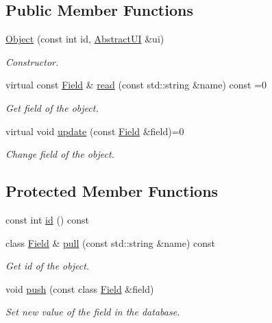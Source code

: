 \subsection*{Public Member Functions}
\begin{DoxyCompactItemize}
\item 
\hyperlink{classCore_1_1Object_ad6367757cadcf5d33d30db9210a545b3}{Object} (const int id, \hyperlink{classCore_1_1AbstractUI}{AbstractUI} \&ui)
\begin{DoxyCompactList}\small\item\em Constructor. \item\end{DoxyCompactList}\item 
virtual const \hyperlink{classCore_1_1Field}{Field} \& \hyperlink{classCore_1_1Object_a90137d9981bd680bd395460e643c6560}{read} (const std::string \&name) const =0
\begin{DoxyCompactList}\small\item\em Get field of the object. \item\end{DoxyCompactList}\item 
virtual void \hyperlink{classCore_1_1Object_a53328d659235e29f418ff4890cc3bdb3}{update} (const \hyperlink{classCore_1_1Field}{Field} \&field)=0
\begin{DoxyCompactList}\small\item\em Change field of the object. \item\end{DoxyCompactList}\end{DoxyCompactItemize}
\subsection*{Protected Member Functions}
\begin{DoxyCompactItemize}
\item 
const int \hyperlink{classCore_1_1Object_a0d6969d36a81dbfa8d832f43eebea9f7}{id} () const 
\item 
class \hyperlink{classCore_1_1Field}{Field} \& \hyperlink{classCore_1_1Object_a0f63419b097657c014bf618baeb62c41}{pull} (const std::string \&name) const 
\begin{DoxyCompactList}\small\item\em Get id of the object. \item\end{DoxyCompactList}\item 
void \hyperlink{classCore_1_1Object_a2e66bbfecbaebbf8695d94b9081796dd}{push} (const class \hyperlink{classCore_1_1Field}{Field} \&field)
\begin{DoxyCompactList}\small\item\em Set new value of the field in the database. \item\end{DoxyCompactList}\end{DoxyCompactItemize}
